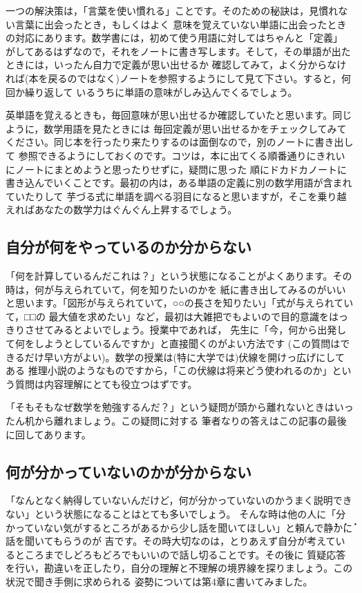 \documentclass[./main]{subfiles}
\begin{document}
一つの解決策は，「言葉を使い慣れる」ことです。そのための秘訣は，見慣れない言葉に出会ったとき，もしくはよく
意味を覚えていない単語に出会ったときの対応にあります。数学書には，初めて使う用語に対してはちゃんと「定義」
がしてあるはずなので，それをノートに書き写します。そして，その単語が出たときには，いったん自力で定義が思い出せるか
確認してみて，よく分からなければ(本を戻るのではなく)ノートを参照するようにして見て下さい。すると，何回か繰り返して
いるうちに単語の意味がしみ込んでくるでしょう。

英単語を覚えるときも，毎回意味が思い出せるか確認していたと思います。同じように，数学用語を見たときには
毎回定義が思い出せるかをチェックしてみてください。同じ本を行ったり来たりするのは面倒なので，別のノートに書き出して
参照できるようにしておくのです。コツは，本に出てくる順番通りにきれいにノートにまとめようと思ったりせずに，疑問に思った
順にドカドカノートに書き込んでいくことです。最初の内は，ある単語の定義に別の数学用語が含まれていたりして
芋づる式に単語を調べる羽目になると思いますが，そこを乗り越えればあなたの数学力はぐんぐん上昇するでしょう。

\subsection{自分が何をやっているのか分からない}

「何を計算しているんだこれは？」という状態になることがよくあります。その時は，何が与えられていて，何を知りたいのかを
紙に書き出してみるのがいいと思います。「図形が与えられていて，○○の長さを知りたい」「式が与えられていて，□□の
最大値を求めたい」など，最初は大雑把でもよいので目的意識をはっきりさせてみるとよいでしょう。授業中であれば，
先生に「今，何から出発して何をしようとしているんですか」と直接聞くのがよい方法です
(この質問はできるだけ早い方がよい)。数学の授業は(特に大学では)伏線を開けっ広げにしてある
推理小説のようなものですから，「この伏線は将来どう使われるのか」という質問は内容理解にとても役立つはずです。

「そもそもなぜ数学を勉強するんだ？」という疑問が頭から離れないときはいったん机から離れましょう。この疑問に対する
筆者なりの答えはこの記事の最後に回してあります。

\subsection{何が分かっていないのかが分からない}

「なんとなく納得していないんだけど，何が分かっていないのかうまく説明できない」という状態になることはとても多いでしょう。
そんな時は他の人に「分かっていない気がするところがあるから少し話を聞いてほしい」と頼んで\.静\.か\.に話を聞いてもらうのが
吉です。その時大切なのは，とりあえず自分が考えているところまでしどろもどろでもいいので話し切ることです。その後に
質疑応答を行い，勘違いを正したり，自分の理解と不理解の境界線を探りましょう。この状況で聞き手側に求められる
姿勢については第4章に書いてみました。
\end{document}
